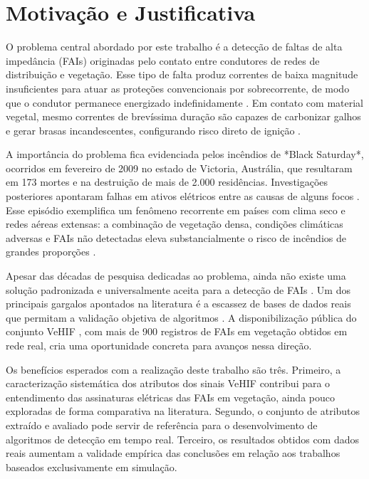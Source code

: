 \section{Motivação e Justificativa}

O problema central abordado por este trabalho é a detecção de faltas de alta impedância (FAIs) originadas pelo contato entre condutores de redes de distribuição e vegetação. Esse tipo de falta produz correntes de baixa magnitude insuficientes para atuar as proteções convencionais por sobrecorrente, de modo que o condutor permanece energizado indefinidamente \cite{1,2}. Em contato com material vegetal, mesmo correntes de brevíssima duração são capazes de carbonizar galhos e gerar brasas incandescentes, configurando risco direto de ignição \cite{8,Ozansoy2020}.

A importância do problema fica evidenciada pelos incêndios de *Black Saturday*, ocorridos em fevereiro de 2009 no estado de Victoria, Austrália, que resultaram em 173 mortes e na destruição de mais de 2.000 residências. Investigações posteriores apontaram falhas em ativos elétricos entre as causas de alguns focos \cite{vic_bushfire_report}. Esse episódio exemplifica um fenômeno recorrente em países com clima seco e redes aéreas extensas: a combinação de vegetação densa, condições climáticas adversas e FAIs não detectadas eleva substancialmente o risco de incêndios de grandes proporções \cite{9,vic_bushfire_report}.

Apesar das décadas de pesquisa dedicadas ao problema, ainda não existe uma solução padronizada e universalmente aceita para a detecção de FAIs \cite{Sedighizadeh2010,Aljohani2020}. Um dos principais gargalos apontados na literatura é a escassez de bases de dados reais que permitam a validação objetiva de algoritmos \cite{Gomes2021VeHIF}. A disponibilização pública do conjunto VeHIF \cite{Gomes2021VeHIF}, com mais de 900 registros de FAIs em vegetação obtidos em rede real, cria uma oportunidade concreta para avanços nessa direção.

Os benefícios esperados com a realização deste trabalho são três. Primeiro, a caracterização sistemática dos atributos dos sinais VeHIF contribui para o entendimento das assinaturas elétricas das FAIs em vegetação, ainda pouco exploradas de forma comparativa na literatura. Segundo, o conjunto de atributos extraído e avaliado pode servir de referência para o desenvolvimento de algoritmos de detecção em tempo real. Terceiro, os resultados obtidos com dados reais aumentam a validade empírica das conclusões em relação aos trabalhos baseados exclusivamente em simulação.

